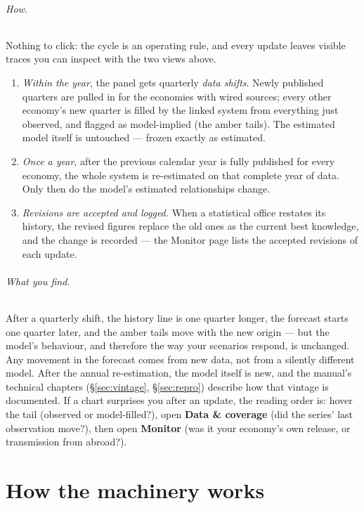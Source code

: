 \documentclass[11pt]{article}
\theoremstyle{definition}
\theoremstyle{remark}
\begin{document}
\paragraph{How.}
Nothing to click: the cycle is an operating rule, and every update leaves visible
traces you can inspect with the two views above.
\begin{enumerate}
  \item \emph{Within the year}, the panel gets quarterly \emph{data shifts}. Newly
    published quarters are pulled in for the economies with wired sources; every
    other economy's new quarter is filled by the linked system from everything
    just observed, and flagged as model-implied (the amber tails). The estimated
    model itself is untouched --- frozen exactly as estimated.
  \item \emph{Once a year}, after the previous calendar year is fully published
    for every economy, the whole system is re-estimated on that complete year of
    data. Only then do the model's estimated relationships change.
  \item \emph{Revisions are accepted and logged.} When a statistical office
    restates its history, the revised figures replace the old ones as the current
    best knowledge, and the change is recorded --- the Monitor page lists the
    accepted revisions of each update.
\end{enumerate}

\paragraph{What you find.}
After a quarterly shift, the history line is one quarter longer, the forecast
starts one quarter later, and the amber tails move with the new origin --- but the
model's behaviour, and therefore the way your scenarios respond, is unchanged. Any
movement in the forecast comes from new data, not from a silently different model.
After the annual re-estimation, the model itself is new, and the manual's technical
chapters (\S\ref{sec:vintage}, \S\ref{sec:repro}) describe how that vintage is
documented. If a chart surprises you after an update, the reading order is: hover
the tail (observed or model-filled?), open \textbf{Data \& coverage}
(did the series' last observation move?), then open \textbf{Monitor} (was it your
economy's own release, or transmission from abroad?).

\clearpage
\part{How the machinery works}\label{part:machinery}
\end{document}
